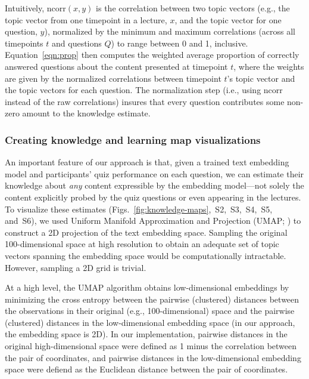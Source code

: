 \documentclass[10pt]{article}
\newcommand{\individualKnowledgeMapsA}{S2}
\newcommand{\individualKnowledgeMapsB}{S3}
\newcommand{\individualKnowledgeMapsC}{S4}
\newcommand{\individualLearningMapsA}{S5}
\newcommand{\individualLearningMapsB}{S6}
\begin{document}
Intuitively, $\mathrm{ncorr}(x, y)$ is the correlation between two topic
vectors (e.g., the topic vector from one timepoint in a lecture, $x$, and the
topic vector for one question, $y$), normalized by the minimum and maximum
correlations (across all timepoints $t$ and questions $Q$) to range between 0 and 1,
inclusive. Equation~\ref{eqn:prop} then computes the weighted average
proportion of correctly answered questions about the content presented at
timepoint $t$, where the weights are given by the normalized correlations
between timepoint $t$'s topic vector and the topic vectors for each question.
The normalization step (i.e., using $\mathrm{ncorr}$ instead of the raw
correlations) insures that every question
contributes some non-zero amount to the knowledge estimate.

\subsubsection*{Creating knowledge and learning map visualizations}\label{subsec:knowledge-maps}

An important feature of our approach is that, given a trained text embedding
model and participants' quiz performance on each question, we can estimate
their knowledge about \textit{any} content expressible by the embedding
model---not solely the content explicitly probed by the quiz questions or even
appearing in the lectures. To visualize these estimates
(Figs.~\ref{fig:knowledge-maps},~\individualKnowledgeMapsA,~\individualKnowledgeMapsB,~\individualKnowledgeMapsC,~\individualLearningMapsA,
and~\individualLearningMapsB), we used Uniform Manifold Approximation and
Projection (UMAP; \citealp{McInEtal18a}) to construct a 2D projection of the
text embedding space. Sampling the original 100-dimensional space at high
resolution to obtain an adequate set of topic vectors spanning the embedding
space would be computationally intractable. However, sampling a 2D grid is
trivial.

At a high level, the UMAP algorithm obtains low-dimensional embeddings by
minimizing the cross entropy between the pairwise (clustered) distances between
the observations in their original (e.g., 100-dimensional) space and the
pairwise (clustered) distances in the low-dimensional embedding space (in our
approach, the embedding space is 2D). In our implementation, pairwise distances
in the original high-dimensional space were defined as 1 minus the correlation
between the pair of coordinates, and pairwise distances in the low-dimensional
embedding space were defiend as the Euclidean distance between the pair of
coordinates.
\end{document}

